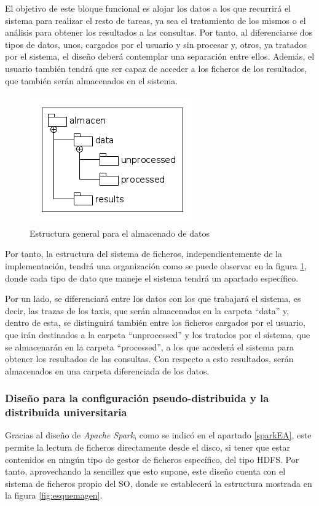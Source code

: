 El objetivo de este bloque funcional es alojar los datos a los que recurrirá el sistema para realizar el resto de tareas, ya sea el tratamiento de los mismos o el análisis para obtener los resultados a las consultas. Por tanto, al diferenciarse dos tipos de datos, unos, cargados por el usuario y sin procesar y, otros, ya tratados por el sistema, el diseño deberá contemplar una separación entre ellos. Además, el usuario también tendrá que ser capaz de acceder a los ficheros de los resultados, que también serán almacenados en el sistema.

\begin{figure}[htp!]
\centering
\caption{Estructura general para el almacenado de datos}
\label{fig:estructAlmacen}
\includegraphics[scale=0.8]{diagramas/estrucAlmacen}
\end{figure}

Por tanto, la estructura del sistema de ficheros, independientemente de la implementación, tendrá una organización como se puede observar en la figura \ref{fig:estructAlmacen}, donde cada tipo de dato que maneje el sistema tendrá un apartado específico.

Por un lado, se diferenciará entre los datos con los que trabajará el sistema, es decir, las trazas de los taxis, que serán almacenadas en la carpeta ``data'' y, dentro de esta, se distinguirá también entre los ficheros cargados por el usuario, que irán destinados a la carpeta ``unprocessed'' y los tratados por el sistema, que se almacenarán en la carpeta ``processed'', a los que accederá el sistema para obtener los resultados de las consultas. Con respecto a esto resultados, serán almacenados en una carpeta diferenciada de los datos.

\subsubsection{Diseño para la configuración pseudo-distribuida y la distribuida universitaria \label{disNormal}}
Gracias al diseño de \textit{Apache Spark}, como se indicó en el apartado \ref{sparkEA}, este permite la lectura de ficheros directamente desde el disco, si tener que estar contenidos en ningún tipo de gestor de ficheros específico, del tipo \gls{HDFS}. Por tanto, aprovechando la sencillez que esto supone, este diseño cuenta con el sistema de ficheros propio del \gls{SO}, donde se establecerá la estructura mostrada en la figura \ref{fig:esquemagen}.

